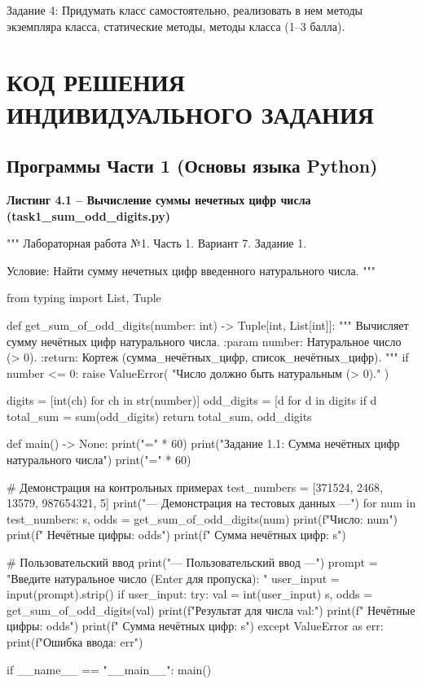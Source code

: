 \documentclass[14pt,a4paper]{extarticle}
\newcommand{\listingtitle}[1]{%
  \par\vspace{8pt}%
  \noindent\hspace*{1.25cm}\textbf{#1}\par\vspace{2pt}%
}
\begin{document}
Задание 4: Придумать класс самостоятельно, реализовать в нем методы экземпляра класса, статические методы, методы класса (1--3 балла).

\section{КОД РЕШЕНИЯ ИНДИВИДУАЛЬНОГО ЗАДАНИЯ}

\subsection{Программы Части 1 (Основы языка Python)}

\listingtitle{Листинг 4.1 -- Вычисление суммы нечетных цифр числа (task1\_sum\_odd\_digits.py)}
\begin{CodeListing}
"""
Лабораторная работа №1. Часть 1.
Вариант 7. Задание 1.

Условие:
Найти сумму нечетных цифр введенного натурального числа.
"""

from typing import List, Tuple


def get_sum_of_odd_digits(number: int) -> Tuple[int, List[int]]:
    """
    Вычисляет сумму нечётных цифр натурального числа.
    :param number: Натуральное число (> 0).
    :return: Кортеж (сумма_нечётных_цифр, список_нечётных_цифр).
    """
    if number <= 0:
        raise ValueError(
            "Число должно быть натуральным (> 0)."
        )

    digits = [int(ch) for ch in str(number)]
    odd_digits = [d for d in digits if d %
    total_sum = sum(odd_digits)
    return total_sum, odd_digits


def main() -> None:
    print("=" * 60)
    print("Задание 1.1: Сумма нечётных цифр натурального числа")
    print("=" * 60)

    # Демонстрация на контрольных примерах
    test_numbers = [371524, 2468, 13579, 987654321, 5]
    print("\n--- Демонстрация на тестовых данных ---")
    for num in test_numbers:
        s, odds = get_sum_of_odd_digits(num)
        print(f"Число: {num}")
        print(f"  Нечётные цифры: {odds}")
        print(f"  Сумма нечётных цифр: {s}\n")

    # Пользовательский ввод
    print("--- Пользовательский ввод ---")
    prompt = "Введите натуральное число (Enter для пропуска): "
    user_input = input(prompt).strip()
    if user_input:
        try:
            val = int(user_input)
            s, odds = get_sum_of_odd_digits(val)
            print(f"Результат для числа {val}:")
            print(f"  Нечётные цифры: {odds}")
            print(f"  Сумма нечётных цифр: {s}")
        except ValueError as err:
            print(f"Ошибка ввода: {err}")


if __name__ == "__main__":
    main()
\end{CodeListing}
\end{document}
